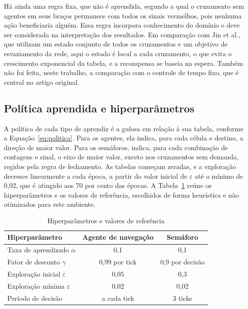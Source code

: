 \documentclass[12pt]{article}
\begin{document}
Há ainda uma regra fixa, que não é aprendida, segundo a qual o cruzamento sem agentes em seus braços permanece com todos os
sinais vermelhos, pois nenhuma ação beneficiaria alguém. Essa regra incorpora conhecimento do domínio e deve ser
considerada na interpretação dos resultados. Em comparação com Jin et al., que utilizam um estado conjunto de todos os
cruzamentos e um objetivo de esvaziamento da rede, aqui o estado é local a cada cruzamento, o que evita o crescimento
exponencial da tabela, e a recompensa se baseia na espera. Também não foi feita, neste trabalho, a comparação com o
controle de tempo fixo, que é central no artigo original.

\subsection{Política aprendida e hiperparâmetros}

A política de cada tipo de aprendiz é a gulosa em relação à sua tabela, conforme a Equação~\ref{eq:politica}. Para os
agentes, ela indica, para cada célula e destino, a direção de maior valor. Para os semáforos, indica, para cada combinação
de contagens e sinal, o eixo de maior valor, exceto nos cruzamentos sem demanda, regidos pela regra de fechamento. As
tabelas começam zeradas, e a exploração decresce linearmente a cada época, a partir do valor inicial de $\varepsilon$ até o
mínimo de 0,02, que é atingido aos 70 por cento das épocas. A Tabela~\ref{tab:hiperparametros} reúne os hiperparâmetros e os
valores de referência, escolhidos de forma heurística e não otimizados para este ambiente.

\begin{table}[ht]
\centering
\caption{Hiperparâmetros e valores de referência}
\label{tab:hiperparametros}
\footnotesize
\begin{tabular}{lcc}
\toprule
Hiperparâmetro & Agente de navegação & Semáforo \\
\midrule
Taxa de aprendizado $\alpha$ & 0,1 & 0,1 \\
Fator de desconto $\gamma$ & 0,99 por tick & 0,9 por decisão \\
Exploração inicial $\varepsilon$ & 0,05 & 0,3 \\
Exploração mínima $\varepsilon$ & 0,02 & 0,02 \\
Período de decisão & a cada tick & 3 ticks \\
\bottomrule
\end{tabular}
\end{table}
\end{document}
